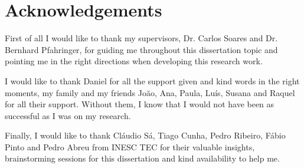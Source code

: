 \chapter*{Acknowledgements}

First of all I would like to thank my supervisors, Dr. Carlos Soares and Dr. Bernhard Pfahringer, for guiding me throughout this dissertation topic and pointing me in the right directions when developing this research work.

I would like to thank Daniel for all the support given and kind words in the right moments, my family and my friends João, Ana, Paula, Luís, Susana and Raquel for all their support.
Without them, I know that I would not have been as successful as I was on my research.

Finally, I would like to thank Cláudio Sá, Tiago Cunha, Pedro Ribeiro, Fábio Pinto and Pedro Abreu from INESC TEC for their valuable insights, brainstorming sessions for this dissertation and kind availability to help me.


\vspace{10mm}
